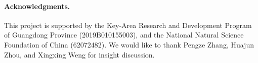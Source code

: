 \documentclass[10pt,twocolumn,letterpaper]{article}
\begin{document}
\paragraph{Acknowledgments.} This project is supported by the Key-Area Research and Development Program of Guangdong Province (2019B010155003), and the National Natural Science Foundation of China (62072482). We would like to thank Pengze Zhang, Huajun Zhou, and Xingxing Weng for insight discussion.

\newpage
{\small


}
\end{document}
